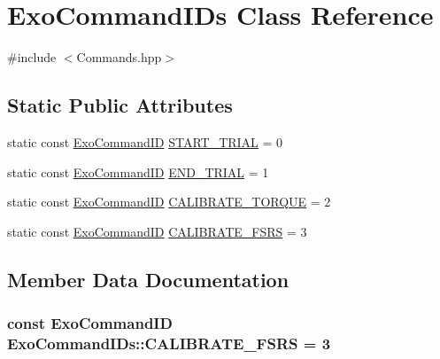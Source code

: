 \hypertarget{classExoCommandIDs}{}\section{Exo\+Command\+I\+Ds Class Reference}
\label{classExoCommandIDs}


{\ttfamily \#include $<$Commands.\+hpp$>$}

\subsection*{Static Public Attributes}
\begin{DoxyCompactItemize}
\item 
static const \hyperlink{Commands_8hpp_a4a0419b573bf683fef9162331e6ec74e}{Exo\+Command\+ID} \hyperlink{classExoCommandIDs_afb527e21397c4ed34c37761c8e66c3a8}{S\+T\+A\+R\+T\+\_\+\+T\+R\+I\+AL} = 0
\item 
static const \hyperlink{Commands_8hpp_a4a0419b573bf683fef9162331e6ec74e}{Exo\+Command\+ID} \hyperlink{classExoCommandIDs_a72245f17b9ebda2742d181facde3c192}{E\+N\+D\+\_\+\+T\+R\+I\+AL} = 1
\item 
static const \hyperlink{Commands_8hpp_a4a0419b573bf683fef9162331e6ec74e}{Exo\+Command\+ID} \hyperlink{classExoCommandIDs_af8e8a8a8a8e1bf4ebb8ad2ef561f8dd9}{C\+A\+L\+I\+B\+R\+A\+T\+E\+\_\+\+T\+O\+R\+Q\+UE} = 2
\item 
static const \hyperlink{Commands_8hpp_a4a0419b573bf683fef9162331e6ec74e}{Exo\+Command\+ID} \hyperlink{classExoCommandIDs_ae709797110384e57f92e391ae7ffa5dc}{C\+A\+L\+I\+B\+R\+A\+T\+E\+\_\+\+F\+S\+RS} = 3
\end{DoxyCompactItemize}


\subsection{Member Data Documentation}
\subsubsection[{\texorpdfstring{C\+A\+L\+I\+B\+R\+A\+T\+E\+\_\+\+F\+S\+RS}{CALIBRATE_FSRS}}]{\setlength{\rightskip}{0pt plus 5cm}const {\bf Exo\+Command\+ID} Exo\+Command\+I\+Ds\+::\+C\+A\+L\+I\+B\+R\+A\+T\+E\+\_\+\+F\+S\+RS = 3\hspace{0.3cm}{\ttfamily [static]}}\hypertarget{classExoCommandIDs_ae709797110384e57f92e391ae7ffa5dc}{}\label{classExoCommandIDs_ae709797110384e57f92e391ae7ffa5dc}

